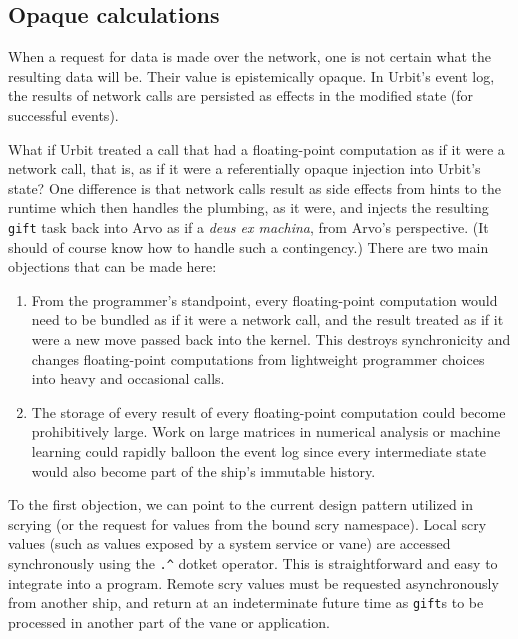\documentclass[twoside]{article}
\begin{document}
\subsection{Opaque calculations}

When a request for data is made over the network, one is not certain what the resulting data will be.  Their value is epistemically opaque.  In Urbit's event log, the results of network calls are persisted as effects in the modified state (for successful events).

What if Urbit treated a call that had a floating-point computation as if it were a network call, that is, as if it were a referentially opaque injection into Urbit's state?  One difference is that network calls result as side effects from hints to the runtime which then handles the plumbing, as it were, and injects the resulting \texttt{gift} task back into Arvo as if a \emph{deus ex machina}, from Arvo's perspective.  (It should of course know how to handle such a contingency.)  There are two main objections that can be made here:

\begin{enumerate}
  \item  From the programmer's standpoint, every floating-point computation would need to be bundled as if it were a network call, and the result treated as if it were a new move passed back into the kernel.  This destroys synchronicity and changes floating-point computations from lightweight programmer choices into heavy and occasional calls.

  \item  The storage of every result of every floating-point computation could become prohibitively large.  Work on large matrices in numerical analysis or machine learning could rapidly balloon the event log since every intermediate state would also become part of the ship's immutable history.
\end{enumerate}

To the first objection, we can point to the current design pattern utilized in scrying (or the request for values from the bound scry namespace).  Local scry values (such as values exposed by a system service or vane) are accessed synchronously using the \lstinline[style=inlinecode]{.^} dotket operator.  This is straightforward and easy to integrate into a program.  Remote scry values must be requested asynchronously from another ship, and return at an indeterminate future time as \lstinline[style=inlinecode]{gift}s to be processed in another part of the vane or application.
\end{document}
